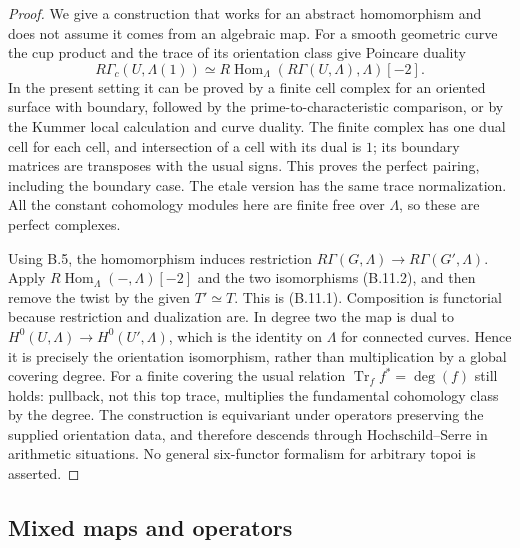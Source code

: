 \begin{proof}
We give a construction that works for an abstract
homomorphism and does not assume it comes from an
algebraic map. For a smooth geometric curve the cup product
and the trace of its orientation class give Poincare
duality
\[
 R\Gamma_c(U,\Lambda(1))\simeq
 R\operatorname{Hom}_\Lambda(R\Gamma(U,\Lambda),\Lambda)[-2].
                                                               \tag{B.11.2}
\]
In the present setting it can be proved by a finite cell
complex for an oriented surface with boundary, followed
by the prime-to-characteristic comparison, or by the
Kummer local calculation and curve duality. The finite
complex has one dual cell for each cell, and intersection
of a cell with its dual is $1$; its boundary matrices are
transposes with the usual signs. This proves the perfect
pairing, including the boundary case. The etale version
has the same trace normalization. All the constant
cohomology modules here are finite free over $\Lambda$,
so these are perfect complexes.

Using B.5, the homomorphism induces restriction
$R\Gamma(G,\Lambda)\to R\Gamma(G',\Lambda)$.
Apply $R\operatorname{Hom}_\Lambda(-,\Lambda)[-2]$ and the
two isomorphisms (B.11.2), and then remove the twist by
the given $T'\simeq T$. This is (B.11.1). Composition is
functorial because restriction and dualization are. In
degree two the map is dual to
$H^0(U,\Lambda)\to H^0(U',\Lambda)$, which is the identity
on $\Lambda$ for connected curves. Hence it is precisely
the orientation isomorphism, rather than multiplication
by a global covering degree. For a finite covering the
usual relation $\operatorname{Tr}_f f^*=\deg(f)$ still
holds: pullback, not this top trace, multiplies the
fundamental cohomology class by the degree. The construction
is equivariant under operators preserving the supplied
orientation data, and therefore descends through
Hochschild--Serre in arithmetic situations. No general
six-functor formalism for arbitrary topoi is asserted.
\end{proof}

\subsection{Mixed maps and operators}

